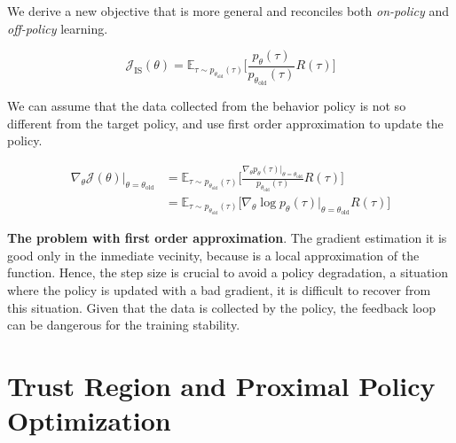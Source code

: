 \noindent We derive a new objective that is more general and reconciles both \textit{on-policy} and \textit{off-policy} learning.

\begin{equation}\label{eqn:rl-objective-with-is}
    \mathcal{J}_{\text{IS}}(\theta) = \mathbb{E}_{\tau\sim p_{\theta_{\text{old}}}(\tau)}\bigg[\frac{p_{\theta}(\tau)}{p_{\theta_{\text{old}}}(\tau)} R(\tau)\bigg]
\end{equation}

\noindent We can assume that the data collected from the behavior policy is
not so different from the target policy, and use first order approximation to
update the policy. 

\begin{equation}\label{eqn:rl-objective-is-linear-aprox}
    \begin{split}
        \nabla_{\theta}\mathcal{J}(\theta)\rvert_{\theta=\theta_{\text{old}}} &= \mathbb{E}_{\tau\sim p_{\theta_{\text{old}}}(\tau)} \bigg[\frac{\nabla_{\theta} p_{\theta}(\tau)\rvert_{\theta=\theta_{\text{old}}}}{p_{\theta_{\text{old}}}(\tau)} R(\tau)\bigg] \\
        &= \mathbb{E}_{\tau\sim p_{\theta_{\text{old}}}(\tau)} \big[\nabla_{\theta}\log p_{\theta}(\tau)\rvert_{\theta=\theta_{\text{old}}} R(\tau) \big]
    \end{split}
\end{equation}


\noindent \textbf{The problem with first order approximation}. The gradient estimation it is good only in the inmediate vecinity, because is a local approximation of the function. Hence, the step size is crucial to avoid a policy degradation, a situation where the policy is updated with a bad gradient,
it is difficult to recover from this situation. Given that the data is collected by the policy, the feedback loop can be dangerous for the training
stability. \\

\section{Trust Region and Proximal Policy Optimization}




